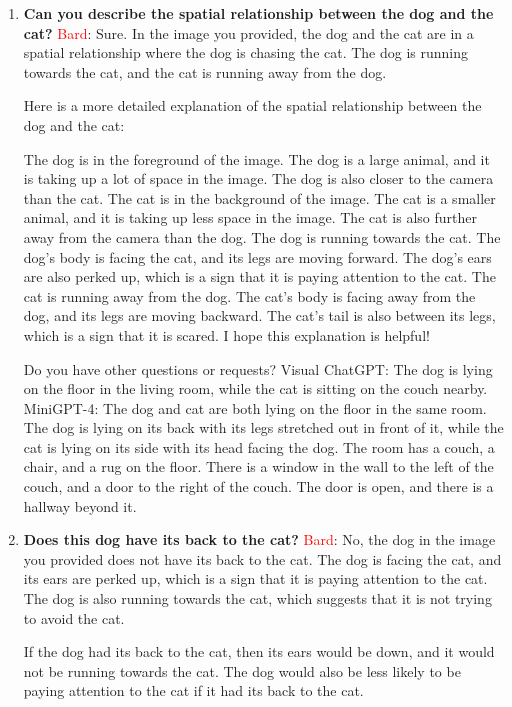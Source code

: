 \begin{enumerate}
    \item \textbf{Can you describe the spatial relationship between the dog and the cat?}
    \subitem \textcolor{Red}{Bard}: Sure. In the image you provided, the dog and the cat are in a spatial relationship where the dog is chasing the cat. The dog is running towards the cat, and the cat is running away from the dog.

    Here is a more detailed explanation of the spatial relationship between the dog and the cat:
    
    The dog is in the foreground of the image. The dog is a large animal, and it is taking up a lot of space in the image. The dog is also closer to the camera than the cat.
    The cat is in the background of the image. The cat is a smaller animal, and it is taking up less space in the image. The cat is also further away from the camera than the dog.
    The dog is running towards the cat. The dog's body is facing the cat, and its legs are moving forward. The dog's ears are also perked up, which is a sign that it is paying attention to the cat.
    The cat is running away from the dog. The cat's body is facing away from the dog, and its legs are moving backward. The cat's tail is also between its legs, which is a sign that it is scared.
    I hope this explanation is helpful!
    
    Do you have other questions or requests?
    \subitem Visual ChatGPT: The dog is lying on the floor in the living room, while the cat is sitting on the couch nearby.
    \subitem MiniGPT-4: The dog and cat are both lying on the floor in the same room. The dog is lying on its back with its legs stretched out in front of it, while the cat is lying on its side with its head facing the dog. The room has a couch, a chair, and a rug on the floor. There is a window in the wall to the left of the couch, and a door to the right of the couch. The door is open, and there is a hallway beyond it.
    \item \textbf{Does this dog have its back to the cat?}
    \subitem \textcolor{Red}{Bard}: 
    No, the dog in the image you provided does not have its back to the cat. The dog is facing the cat, and its ears are perked up, which is a sign that it is paying attention to the cat. The dog is also running towards the cat, which suggests that it is not trying to avoid the cat.
    
    If the dog had its back to the cat, then its ears would be down, and it would not be running towards the cat. The dog would also be less likely to be paying attention to the cat if it had its back to the cat.
    

\end{enumerate}
